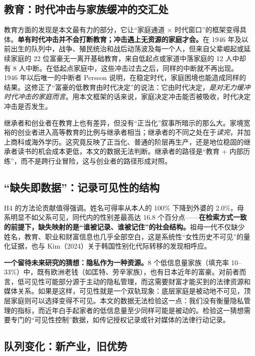 \documentclass[UTF8,a4paper,11pt]{ctexart}
\begin{document}
\subsection{教育：时代冲击与家族缓冲的交汇处}

教育方面的发现是本文最有力的部分，它让“家庭通道 × 时代窗口”的框架变得具体。\textbf{单有时代冲击并不会打断教育；冲击遇上无资源的家庭才会。}在 1946 年及以前出生的队列中，战争、殖民统治和战后动荡波及每一个人，但来自父辈崛起或延续家庭的 22 位富豪无一离开基础教育，来自低起点或家道中落家庭的 12 人中却有 8 人中断。在低起点家庭中，这些冲击过去之后，同样的中断就不再出现。1946 年以后唯一的中断者 Persson 说明，在稳定时代，家庭困境也能造成同样的结果。这修正了“富豪的低教育由时代决定”的说法：它由时代决定，\emph{是对无力缓冲时代冲击的家庭而言}。用本文框架的话来说，家庭决定冲击能否被吸收，时代决定冲击是否发生。

继承者和创业者在教育上也有差异，但没有“正当化”叙事所暗示的那么大。家境宽裕的创业者进入高等教育的比例与继承者相当；继承者的不同之处在于\emph{读完}，并加上商科或海外学历。这究竟反映了正当化、普通的阶层再生产，还是地位稳固的继承者读书的机会成本更低，本文的数据无法判断。继承者的路径是“教育 + 内部历练”，而不是跨行业冒险，这与创业者的路径形成对照。

\subsection{“缺失即数据”：记录可见性的结构}

H4 的方法论贡献值得强调。姓名可得率从本人的 100\% 下降到外婆的 2.0\%，母系明显不如父系可见，同代内的性别差最高达 16.8 个百分点——\textbf{在检索方式一致的前提下，缺失映射的是“谁被记录、谁被记住”的社会结构。}祖母一代不仅缺少姓名，教育、职业和财富信息也几乎全部空白，这是系统性“女性历史不可见”的量化证据，也与 Kim（2024）关于韩国性别化代际转移的发现相呼应。

\textbf{一个留待未来研究的猜想：隐私作为一种资源。}8 个低信息量家族（填充率 10--33\%）中，既有欧洲老钱（如匡特、劳辛家族），也有日本近年的富豪。对前者而言，低可见性可能部分源于主动的隐私管理，而这需要财富才能买到的法律资源和媒体关系。如果是这样，可见性就是一个双轨现象：底层家庭是被动地不可见，顶层家庭则可以选择变得不可见。本文的数据无法检验这一点：我们没有衡量隐私管理的指标，而近年白手起家者的低信息量至少同样可能是被动的。检验这一猜想需要专门的“可见性控制”数据，如传记授权记录或针对媒体的法律行动记录。

\subsection{队列变化：新产业，旧优势}
\end{document}
